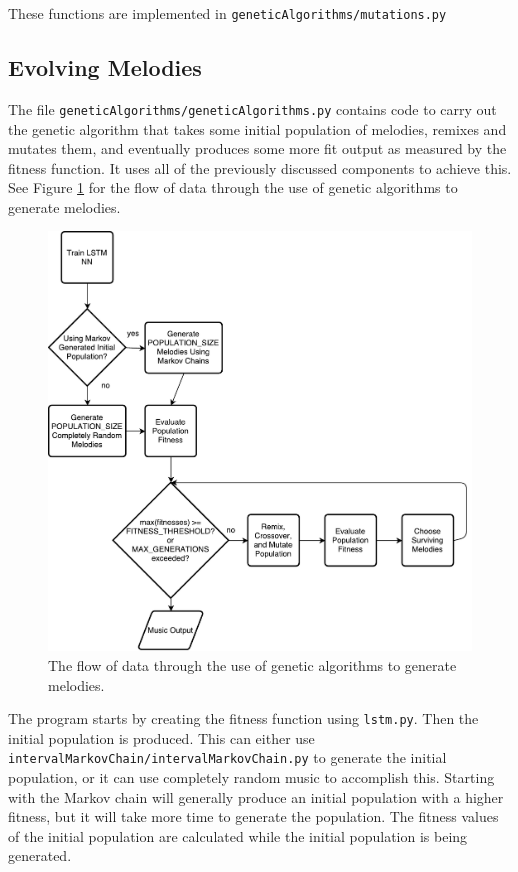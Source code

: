 These functions are implemented in \texttt{geneticAlgorithms/mutations.py}

\subsection{Evolving Melodies} \label{software:ga:evolving}

The file \texttt{geneticAlgorithms/geneticAlgorithms.py} contains code to carry out the genetic algorithm that takes some initial population of melodies, remixes and mutates them, and eventually produces some more fit output as measured by the fitness function.
It uses all of the previously discussed components to achieve this.
See Figure \ref{fig:gaflowchart} for the flow of data through the use of genetic algorithms to generate melodies.

\begin{figure}[h!]
	\centering
	\includegraphics[width=\linewidth]{figures/genetic_algorithm_flowchart.pdf}
	\caption{The flow of data through the use of genetic algorithms to generate melodies.}
	\label{fig:gaflowchart}
\end{figure}

The program starts by creating the fitness function using \texttt{lstm.py}.
Then the initial population is produced.
This can either use \texttt{intervalMarkovChain/intervalMarkovChain.py} to generate the initial population, or it can use completely random music to accomplish this.
Starting with the Markov chain will generally produce an initial population with a higher fitness, but it will take more time to generate the population.
The fitness values of the initial population are calculated while the initial population is being generated.

